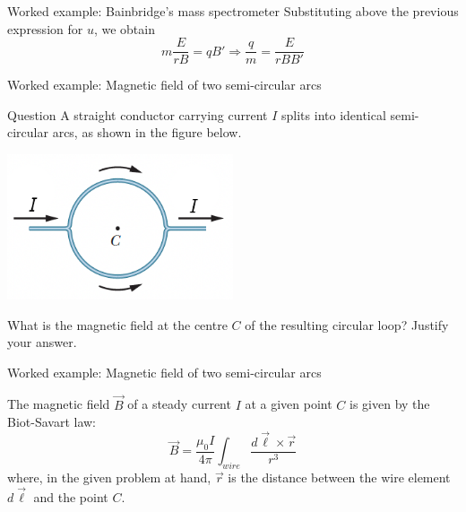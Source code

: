 {\begin{frame}{Worked example: Bainbridge's mass spectrometer}
  Substituting above the previous expression for $u$, we obtain
  \begin{equation*}
    m \frac{E}{rB} = q B' \Rightarrow
    \frac{q}{m} = \frac{E}{rBB'}
      \end{equation*}

\end{frame}

} %


%
%

{
\problemslide

\begin{frame}{Worked example: Magnetic field of two semi-circular arcs}

  \begin{blockexmplque}{Question}
   A straight conductor carrying current $I$ splits into identical
   semi-circular arcs, as shown in the figure below.
   \begin{center}
     \includegraphics[width=0.50\textwidth]{./images/problems/lect05_wire_splitting_semicircular_arcs_2}\\
   \end{center}
   What is the magnetic field at the centre $C$ of the resulting circular loop?
   Justify your answer.
 \end{blockexmplque}

\end{frame}

%
%
%

\begin{frame}{Worked example: Magnetic field of two semi-circular arcs}

 The magnetic field $\vec{B}$ of a steady current $I$ at a given point $C$
 is given by the Biot-Savart law:
 \begin{equation*}
   \vec{B} = \frac{\mu_0I}{4\pi} \int_{wire} \frac{d\vec{\ell} \times \vec{r}}{r^3}
 \end{equation*}
 where, in the given problem at hand,
 $\vec{r}$ is the distance between the wire element $d\vec{\ell}$ and
 the point $C$.\\
 \vspace{0.3cm}


\end{frame}}
